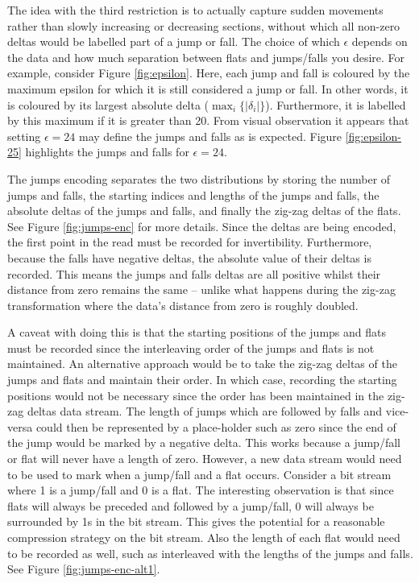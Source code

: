 The idea with the third restriction is to actually capture sudden movements
rather than slowly increasing or decreasing sections, without which all non-zero
deltas would be labelled part of a jump or fall. The choice of which $\epsilon$
depends on the data and how much separation between flats and jumps/falls you
desire. For example, consider Figure \ref{fig:epsilon}. Here, each jump and fall
is coloured by the maximum epsilon for which it is still considered a jump or
fall. In other words, it is coloured by its largest absolute delta
($\max_i\{|\delta_i|\}$). Furthermore, it is labelled by this maximum if it is
greater than 20. From visual observation it appears that setting $\epsilon=24$
may define the jumps and falls as is expected. Figure \ref{fig:epsilon-25}
highlights the jumps and falls for $\epsilon=24$.




The jumps encoding separates the two distributions by storing the number of
jumps and falls, the starting indices and lengths of the jumps and falls, the
absolute deltas of the jumps and falls, and finally the zig-zag deltas of the
flats. See Figure \ref{fig:jumps-enc} for more details. Since the deltas are
being encoded, the first point in the read must be recorded for invertibility.
Furthermore, because the falls have negative deltas, the absolute value of their
deltas is recorded. This means the jumps and falls deltas are all positive
whilst their distance from zero remains the same -- unlike what happens during
the zig-zag transformation where the data's distance from zero is roughly
doubled.



A caveat with doing this is that the starting positions of the jumps and flats
must be recorded since the interleaving order of the jumps and flats is not
maintained. An alternative approach would be to take the zig-zag deltas of the
jumps and flats and maintain their order. In which case, recording the starting
positions would not be necessary since the order has been maintained in the
zig-zag deltas data stream. The length of jumps which are followed by falls and
vice-versa could then be represented by a place-holder such as zero since the
end of the jump would be marked by a negative delta. This works because a
jump/fall or flat will never have a length of zero. However, a new data stream
would need to be used to mark when a jump/fall and a flat occurs. Consider a bit
stream where 1 is a jump/fall and 0 is a flat. The interesting observation is
that since flats will always be preceded and followed by a jump/fall, 0 will
always be surrounded by 1s in the bit stream. This gives the potential for
a reasonable compression strategy on the bit stream. Also the length of each
flat would need to be recorded as well, such as interleaved with the lengths of
the jumps and falls. See Figure \ref{fig:jumps-enc-alt1}.

